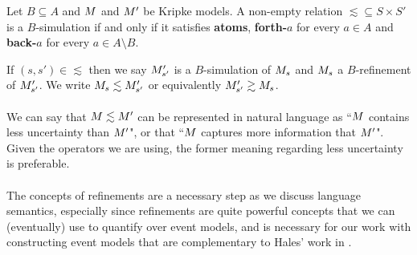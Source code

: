 \begin{defn} \label{refinement}
Let $B \subseteq A$ and $M$ and $M'$ be Kripke models. A non-empty relation $\lesssim \subseteq S
\times S'$ is a $B$-simulation if and only if it satisfies {\bf atoms}, {\bf forth-$a$} for
every $a \in A$ and {\bf back-$a$} for every $a \in A \setminus B$.
\end{defn}
If $(s, s') \in \lesssim$ then we say $M'_{s'}$ is a
$B$-simulation of $M_s$ and
$M_s$ a $B$-refinement of $M'_{s'}$.
We write $M_{s} \lesssim M'_{s'}$ or equivalently
$M'_{s'} \gtrsim M_{s}$.\\
\\
We can say that $M \lesssim M'$ can be represented in natural language as ``$M$ contains
less uncertainty than $M'$", or that ``$M$ captures more information that $M'$".
Given the operators we are using, the former meaning regarding less uncertainty is preferable.\\
\\
The concepts of refinements are a necessary step as we discuss language semantics, especially since
refinements are quite powerful concepts that we can (eventually) use to quantify over event models,
and is necessary for our work with constructing event models that are complementary to Hales' work
in \cite{hales13synthesis}.

%
%
%
%
%

